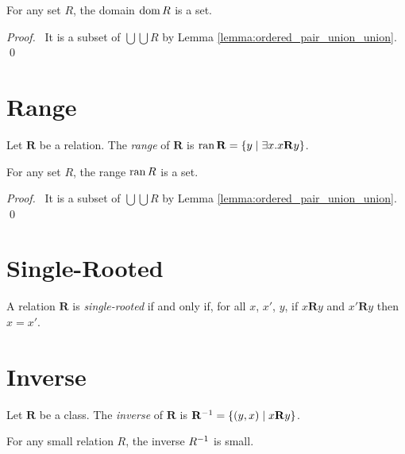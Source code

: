 \begin{theorem}
    \label{theorem:domain}
    For any set $R$, the domain $\operatorname{dom} R$ is a set.
\end{theorem}

\begin{proof}
    \pf\ It is a subset of $\bigcup \bigcup R$ by Lemma \ref{lemma:ordered_pair_union_union}. \qed
\end{proof}

\section{Range}

\begin{definition}[Range]
    Let $\mathbf{R}$ be a relation. The \emph{range} of $\mathbf{R}$ is 
    $\operatorname{ran} \mathbf{R} = \{ y \mid \exists x. x\mathbf{R}y \}$.
\end{definition}

\begin{theorem}
    \label{theorem:range}
    For any set $R$, the range $\operatorname{ran} R$ is a set.
\end{theorem}

\begin{proof}
    \pf\ It is a subset of $\bigcup \bigcup R$ by Lemma \ref{lemma:ordered_pair_union_union}. \qed
\end{proof}

\section{Single-Rooted}

\begin{definition}
    A relation $\mathbf{R}$ is \emph{single-rooted} if and only if, for all $x$, $x'$, $y$, if $x\mathbf{R}y$ and $x'\mathbf{R}y$ then $x = x'$.
\end{definition}

\section{Inverse}

\begin{definition}[Inverse]
    Let $\mathbf{R}$ be a class. The \emph{inverse} of $\mathbf{R}$ is 
    ${\mathbf{R}}^{-1} = \{ (y,x) \mid x \mathbf{R} y \}$.
\end{definition}

\begin{theorem}
    For any small relation $R$, the inverse ${R}^{-1}$ is small.
\end{theorem}

